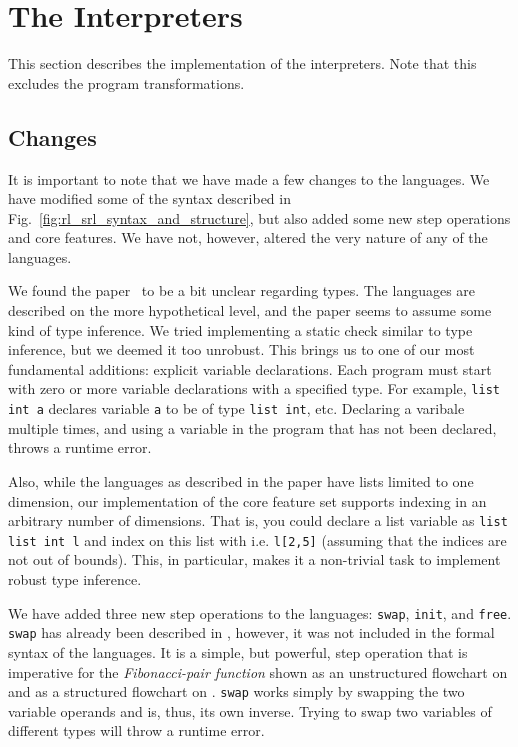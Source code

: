 
\section{The Interpreters}

This section describes the implementation of the interpreters. Note that this excludes the program transformations.

\subsection{Changes}\label{sec:changes}

It is important to note that we have made a few changes to the languages. We have modified some of the syntax described in Fig.~\ref{fig:rl_srl_syntax_and_structure}, but also added some new step operations and core features. We have not, however, altered the very nature of any of the languages.

We found the paper~\cite{REV} to be a bit unclear regarding types. The languages are described on the more hypothetical level, and the paper seems to assume some kind of type inference. We tried implementing a static check similar to type inference, but we deemed it too unrobust. This brings us to one of our most fundamental additions: explicit variable declarations. Each program must start with zero or more variable declarations with a specified type. For example, \texttt{list int a} declares variable \texttt{a} to be of type \texttt{list int}, etc. Declaring a varibale multiple times, and using a variable in the program that has not been declared, throws a runtime error.

Also, while the languages as described in the paper have lists limited to one dimension, our implementation of the core feature set supports indexing in an arbitrary number of dimensions. That is, you could declare a list variable as \texttt{list list int l} and index on this list with i.e. \texttt{l[2,5]} (assuming that the indices are not out of bounds). This, in particular, makes it a non-trivial task to implement robust type inference.

We have added three new step operations to the languages: \texttt{swap}, \texttt{init}, and \texttt{free}. \texttt{swap} has already been described in \cite[p.~99]{REV}, however, it was not included in the formal syntax of the languages. It is a simple, but powerful, step operation that is imperative for the \textit{Fibonacci-pair function} shown as an unstructured flowchart on \cite[p.~99]{REV} and as a structured flowchart on \cite[p.~93]{REV}. \texttt{swap} works simply by swapping the two variable operands and is, thus, its own inverse. Trying to swap two variables of different types will throw a runtime error.

